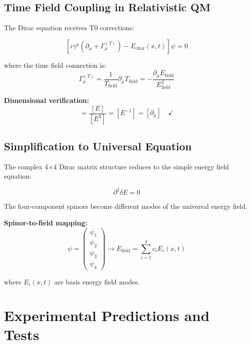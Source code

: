 \documentclass[12pt,a4paper]{report}
\begin{document}
\subsection{Time Field Coupling in Relativistic QM}
\label{subsec:dirac_time_field}

The Dirac equation receives T0 corrections:

\begin{equation}
	\left[i\gamma^\mu\left(\partial_\mu + \Gamma_\mu^{(T)}\right) - E_{\text{char}}(x,t)\right]\psi = 0
\end{equation}

where the time field connection is:
\begin{equation}
	\Gamma_\mu^{(T)} = \frac{1}{T_{\text{field}}} \partial_\mu T_{\text{field}} = -\frac{\partial_\mu E_{\text{field}}}{E_{\text{field}}^2}
\end{equation}

\textbf{Dimensional verification:}
\begin{equation}
	[\Gamma_\mu^{(T)}] = \frac{[E]}{[E^2]} = [E^{-1}] = [\partial_\mu] \quad \checkmark
\end{equation}

\subsection{Simplification to Universal Equation}
\label{subsec:dirac_simplification}

The complex 4×4 Dirac matrix structure reduces to the simple energy field equation:

\begin{equation}
	\partial^2 \delta E = 0
\end{equation}

The four-component spinors become different modes of the universal energy field.

\textbf{Spinor-to-field mapping:}
\begin{equation}
	\psi = \begin{pmatrix} \psi_1 \\ \psi_2 \\ \psi_3 \\ \psi_4 \end{pmatrix} \rightarrow E_{\text{field}} = \sum_{i=1}^4 c_i E_i(x,t)
\end{equation}

where $E_i(x,t)$ are basis energy field modes.

\section{Experimental Predictions and Tests}
\label{sec:experimental_predictions}
\end{document}

